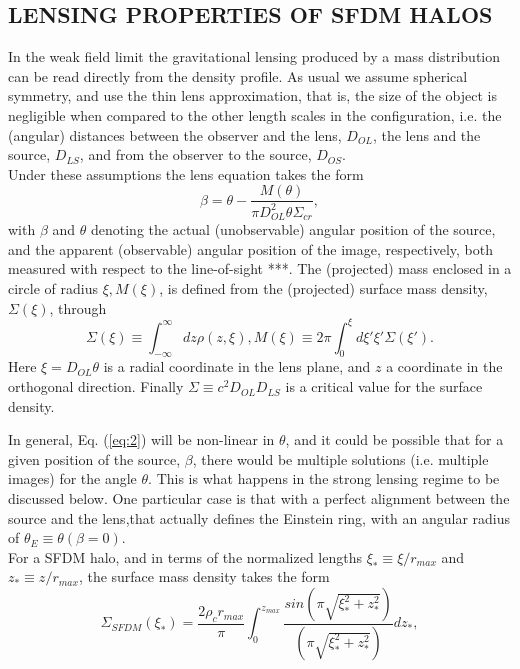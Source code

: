 \documentclass[10pt, letterpaper]{article}
\begin{document}
\begin{multicols}{2}
		\section{\centering\small\selectfont LENSING PROPERTIES OF SFDM HALOS}
		In the weak field limit the gravitational lensing produced by a mass distribution can be read directly from the density profile. As usual we assume spherical symmetry, and use the thin lens approximation, that is, the size of the object is negligible when compared to the other length scales in the configuration, i.e. the (angular) distances between the observer and the lens, $D_{OL}$, the lens and the source, $D_{LS}$, and from the observer to the source, $D_{OS}$. \\
		Under these assumptions the lens equation takes the form
		\begin{equation}\label{eq:2}
			\beta =\theta-\frac{M(\theta)}{\pi D_{OL}^2\theta\Sigma_{cr}} ,
		\end{equation}
		with $\beta$ and $\theta$ denoting the actual (unobservable) angular position of the source, and the apparent (observable) angular position of the image, respectively, both measured with respect to the line-of-sight ***. The (projected) mass enclosed in a circle of radius $\xi, M(\xi)$, is defined from the (projected) surface mass density, $\Sigma(\xi)$, through
		\begin{equation}\label{eq:3}
			\Sigma(\xi)\equiv\int_{-\infty}^\infty dz\rho(z,\xi), M(\xi)\equiv2\pi\int_0^\xi d\xi'\xi'\Sigma(\xi').
		\end{equation}
		Here $\xi=D_{OL}\theta$ is a radial coordinate in the lens plane, and $z$ a coordinate in the orthogonal direction. Finally $\Sigma\equiv c^2D_{OL}D_{LS}$ is a critical value for the surface density.\par
		In general, Eq. (\ref{eq:2}) will be non-linear in $\theta$, and it could be possible that for a given position of the source, $\beta$, there would be multiple solutions (i.e. multiple images) for the angle $\theta$. This is what happens in the strong lensing regime to be discussed below. One particular case is that with a perfect alignment between the source and the lens,that actually defines the Einstein ring, with an angular radius of $\theta_E\equiv\theta(\beta=0)$.\\
		For a SFDM halo, and in terms of the normalized lengths $\xi_*\equiv\xi/r_{max}$ and $z_*\equiv z/r_{max}$, the surface mass
		density takes the form
		\begin{equation}\label{eq:4}
			\Sigma_{SFDM}(\xi_*)=\frac{2\rho_cr_{max}}{\pi}\int_0^{z_{max}} \frac{sin(\pi\sqrt{\xi_*^2+z_*^2})}{(\pi\sqrt{\xi_*^2+z_*^2})}dz_*,

\end{equation}
\end{multicols}
\end{document}
